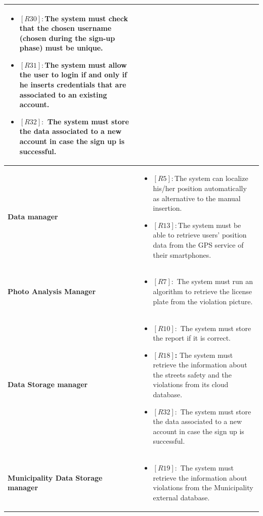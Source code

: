 \documentclass[titlepage]{article}
\begin{document}
\begin{longtable}{| p{4 cm} | p{11.5 cm} |}
\begin{itemize}
			 \item \textbf{$[R30]:$}The system must check that the chosen username (chosen during the sign-up phase) must be unique. 
			 
			 \item \textbf{$[R31]:$}The system must allow the user to login if and only if he
inserts credentials that are associated to an existing account.
			 \item \textbf{$[R32]:$} The system must store the data associated to a new account in case the sign up is successful.
		\end{itemize} \\ \hline
		\newline \textbf {Data manager} &
		\begin{itemize}
			\item \textbf{$[R5]:$}The system can localize his/her position automatically as alternative to the manual insertion.
			\item \textbf{$[R13]:$}The system must be able to retrieve users' position data from the GPS service of their smartphones. 
		\end{itemize} \\ \hline
		\newline \textbf {Photo Analysis Manager} &
		\begin{itemize}
		\item \textbf{$[R7]:$} The system must run an algorithm to retrieve the license plate from the violation picture. 
		\end{itemize} \\ \hline
		\newline \textbf {Data Storage manager} &
		\begin{itemize}
			\item \textbf{$[R10]:$} The system must store the report if it is correct.
			\item \textbf{$[R18]$:} The system must retrieve the information about the streets
safety and the violations from its cloud database.
			\item \textbf{$[R32]:$} The system must store the data associated to a new account in case the sign up is successful.
		\end{itemize} \\ \hline
		\newline \textbf {Municipality Data Storage manager} &
		\begin{itemize}
			\item \textbf{$[R19]:$} The system must retrieve the information about violations
from the Municipality external database.
	
		\end{itemize} \\ \hline
\end{longtable}
\end{document}
